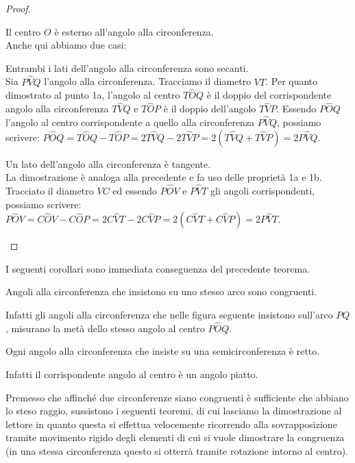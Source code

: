 \begin{proof}
\begin{enumerate*}
\item Il centro $O$ è esterno all'angolo alla circonferenza.\\
Anche qui abbiamo due casi:
\begin{enumerate*}
\item Entrambi i lati dell'angolo alla circonferenza sono secanti.\\
Sia $P\widehat{V}Q$ l'angolo alla circonferenza. Tracciamo il diametro $VT$. Per quanto dimostrato al punto 1a, l'angolo al centro $T\widehat{O}Q$ è il doppio del corrispondente angolo alla circonferenza $T\widehat{V}Q$ e $T\widehat{O}P$ è il doppio dell'angolo $T\widehat{V}P$. Essendo $P\widehat{O}Q$ l'angolo al centro corrispondente a quello alla circonferenza $P\widehat{V}Q$, possiamo  scrivere: $P\widehat{O}Q=T\widehat{O}Q-T\widehat{O}P=2T\widehat{V}Q-2T\widehat{V}P=2(T\widehat{V}Q+T\widehat{V}P)=2P\widehat{V}Q$.
\item Un lato dell'angolo alla circonferenza è tangente.\\
La dimostrazione è analoga alla precedente e fa uso delle proprietà 1a e 1b. Tracciato il diametro $VC$ ed essendo $P\widehat{O}V$ e $P\widehat{V}T$ gli angoli corrispondenti, possiamo scrivere: $P\widehat{O}V=C\widehat{O}V-C\widehat{O}P=2C\widehat{V}T-2C\widehat{V}P=2(C\widehat{V}T+C\widehat{V}P)=2P\widehat{V}T$.
\end{enumerate*}
\end{enumerate*}
\end{proof}

I seguenti corollari sono immediata conseguenza del precedente teorema.
\begin{corollario}
Angoli alla circonferenza che insistono su uno stesso arco sono congruenti.
\end{corollario}


Infatti gli angoli alla circonferenza che nelle figura seguente insistono sull'arco $PQ$, misurano la metà dello stesso angolo al centro $P\widehat{O}Q$.

\begin{corollario}
Ogni angolo alla circonferenza che insiste su una semicirconferenza è retto.
\end{corollario}
Infatti il corrispondente angolo al centro è un angolo piatto.

Premesso che affinché due circonferenze siano congruenti è sufficiente che abbiano lo steso raggio, sussistono i seguenti teoremi, di cui lasciamo la dimostrazione al lettore in quanto questa si effettua velocemente ricorrendo alla sovrapposizione tramite movimento rigido degli elementi di cui si vuole dimostrare la congruenza (in una stessa circonferenza questo si otterrà tramite rotazione intorno al centro).

